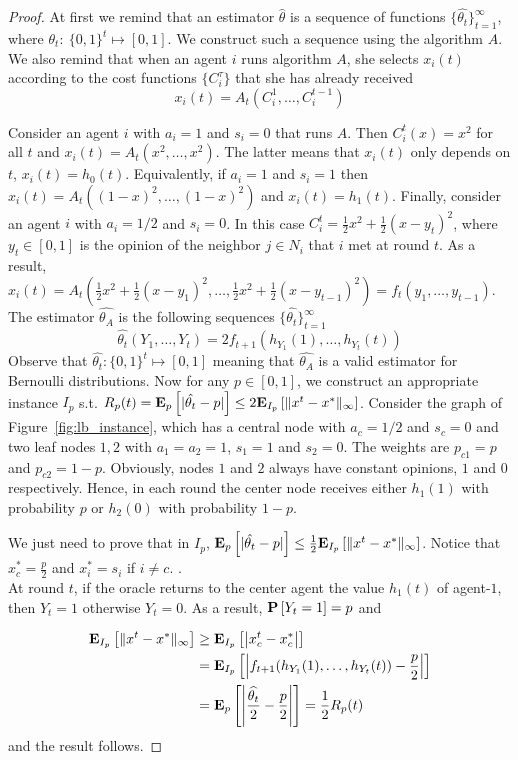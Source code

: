\begin{proof}
  At first we remind that an estimator $\hat{\theta}$ is a sequence
  of functions $\{\hat{\theta_t}\}_{t=1}^{\infty}$, where
  $\theta_t:~\{0,1\}^t\mapsto [0,1]$.  We construct such a sequence using the
  algorithm $A$.  We also remind that when an agent $i$ runs algorithm $A$, she
  selects $x_i(t)$ according to the cost functions $\{C_i^{\tau}\}$ that she
  has already received \[x_i(t)=A_t(C_i^1,\ldots,C_i^{t-1})\]

  Consider an agent $i$ with $a_i=1$ and $s_i=0$ that runs $A$. Then
  $C_i^t(x)=x^2$ for all $t$ and $x_i(t)=A_t(x^2,\ldots,x^2)$.  The latter
  means that $x_i(t)$ only depends on $t$, $x_i(t)=h_0(t)$. Equivalently, if
  $a_i=1$ and $s_i=1$ then $x_i(t)=A_t((1-x)^2,\ldots,(1-x)^2)$ and
  $x_i(t)=h_1(t)$. Finally, consider an agent $i$ with $a_i=1/2$ and $s_i=0$.
  In this case $C_i^t = \frac{1}{2}x^2 + \frac{1}{2}(x-y_t)^2$, where $y_t \in
  [0,1]$ is the opinion of the neighbor $j\in N_i$ that $i$ met at round $t$.
  As a result, $x_i(t)=A_t(\frac{1}{2}x^2+\frac{1}{2}(x-y_1)^2,\ldots,
  \frac{1}{2}x^2+\frac{1}{2}(x-y_{t-1})^2)=f_t(y_1,\ldots,y_{t-1})$.  The
  estimator $\hat{\theta_A}$ is the following sequences
  $\{\hat{\theta_{t}}\}_{t=1}^{\infty}$
  \[
    \hat{\theta_t}(Y_1,\ldots,Y_t) =
    2f_{t+1}(h_{Y_1}(1),\ldots,h_{Y_t}(t))
  \]
  Observe that $\hat{\theta_t}: \{0,1\}^t \mapsto [0,1]$ meaning that
  $\hat{\theta_A}$ is a valid estimator for Bernoulli distributions.
  Now for any $p \in [0,1]$, we construct an appropriate instance
  $I_p$ s.t. $R_p(t)=\bm{\mathrm{E}}_{p} \left[ |\hat{\theta_t} - p| \right] \leq
  2\bm{\mathrm{E}}_{I_p} \left[ \| x^t-x^* \|_{\infty} \right]$.  
  Consider the graph of Figure~\ref{fig:lb_instance}, which has a central node 
  with $a_c = 1/2$ and $s_c = 0$ and two leaf nodes $1,2$ with 
  $a_1 = a_2 = 1$, $s_1 = 1$ and $s_2 = 0$. The weights are $p_{c1} = p$ 
  and $ p_{c2} = 1-p$. Obviously, nodes $1$ and $2$ always have constant 
  opinions, $1$ and $0$ respectively. Hence, in each round the center node 
  receives either $h_1(1)$ with probability $p$ or $h_2(0)$ with probability $1-p$. 

  We just need to prove that in $I_p$, $\bm{\mathrm{E}}_{p} \left[ |\hat{\theta_t}-p| \right] \leq
  \frac{1}{2}\bm{\mathrm{E}}_{I_p} \left[ \| x^t-x^* \|_{\infty} \right]$. Notice that $x^*_c=\frac{p}{2}$ and
  $x^*_i=s_i$ if $i\neq c$. .\\ At round $t$, if the oracle returns to the
  center agent the value $h_1(t)$ of agent-$1$, then $Y_t=1$ otherwise
  $Y_t=0$. As a result, $\bm{\mathrm{P}}\left[Y_t=1\right]=p$ and

  \begin{align*}
    \bm{\mathrm{E}}_{I_p} \left[ \| x^t-x^* \|_{\infty} \right]
    &\geq
    \bm{\mathrm{E}}_{I_p} \left[ \left|x^t_c-x^*_c\right| \right]\\
    &= \bm{\mathrm{E}}_{I_p} \left[ \left| f_{t+1}(h_{Y_1}(1),\ldots,h_{Y_t}(t)) - \frac{p}{2}\right| \right]\\
    &=
    \bm{\mathrm{E}}_{p} \left[ \left|\frac{\widehat{\theta_t}}{2}-\frac{p}{2}\right| \right] = \frac{1}{2}R_p(t)
  \end{align*} 
  and the result follows.
  \end{proof}

